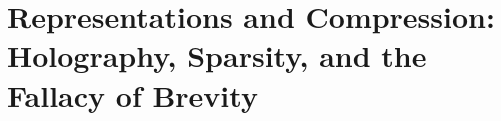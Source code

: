 \documentclass[11pt,twoside]{book}
\begin{document}
\frontmatter
\tableofcontents

\mainmatter
\part{Representations and Compression: Holography, Sparsity, and the Fallacy of Brevity}





\backmatter
\appendix


\end{document}
